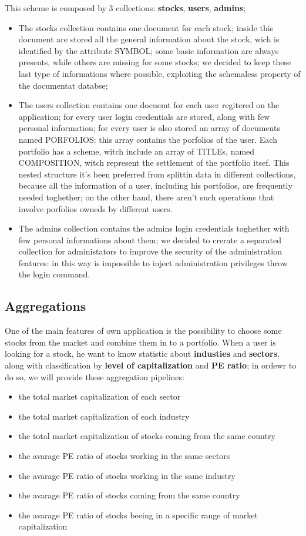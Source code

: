 This scheme is composed by 3 collections: \textbf{stocks}, \textbf{users}, \textbf{admins};
\begin{itemize}
    \item
The stocks collection contains one document for each stock; inside this document are stored 
all the general information about the stock, wich is identified by the attribute SYMBOL;
some basic information are always presents, while others are missing for some stocks; we decided 
to keep these last type of informations where possible, exploiting the schemaless property of
the documentat databse;
    \item
The users collection contains one docuemt for each user regitered on the application; for every
user login credentials are stored, along with few personal information; for every user is 
also stored an array of documents named PORFOLIOS: this array contains the porfolios of the user.
Each portfolio has a scheme, witch include an array of TITLEs, named COMPOSITION, witch represent
the settlement of the portfolio itsef. This nested structure it's been preferred from splittin
data in different collections, because all the information of a user, including his portfolios, 
are frequently needed toghether; on the other hand, there aren't such operations that involve
porfolios owneds by different users.
    \item 
The admins collection contains the admins login credentials toghether with few personal
informations about them; we decided to crerate a separated collection for administators 
to improve the security of the administration features: in this way is impossible to inject
administration privileges throw the login command.
\end{itemize}
\subsection{Aggregations}
One of the main features of own application is the possibility to choose some stocks from
the market and combine them in to a portfolio. When a user is looking for a stock, he want to
know statistic about \textbf{industies} and \textbf{sectors}, along with classification by 
\textbf{level of capitalization} and  \textbf{PE ratio}; in ordewr to do so, we will provide
these aggregation pipelines:
\begin{itemize}
    \item the total market capitalization of each sector
    \item the total market capitalization of each industry
    \item the total market capitalization of stocks coming from the same country
    \item the avarage PE ratio of stocks working in the same sectors
    \item the avarage PE ratio of stocks working in the same industry
    \item the avarage PE ratio of stocks coming from the same country
    \item the avarage PE ratio of stocks beeing in a specific range of market capitalization
\end{itemize}
